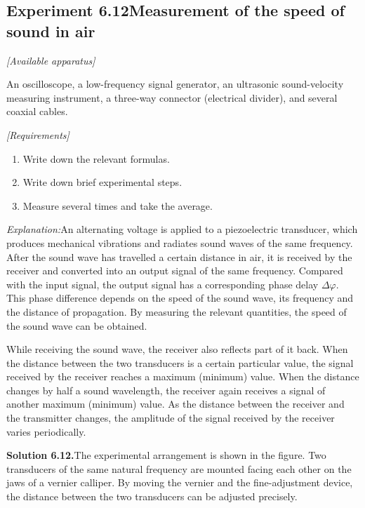 \subsection*{Experiment 6.12\quad Measurement of the speed of sound in air}

\noindent\textit{[Available apparatus]}

An oscilloscope, a low-frequency signal generator, an ultrasonic sound-velocity measuring instrument, a three-way connector (electrical divider), and several coaxial cables.

\noindent\textit{[Requirements]}
\begin{enumerate}[label=(\arabic*),leftmargin=2.2em,itemsep=1pt,topsep=2pt]
\item Write down the relevant formulas.
\item Write down brief experimental steps.
\item Measure several times and take the average.
\end{enumerate}

\noindent\textit{Explanation:}\quad An alternating voltage is applied to a piezoelectric transducer, which produces mechanical vibrations and radiates sound waves of the same frequency. After the sound wave has travelled a certain distance in air, it is received by the receiver and converted into an output signal of the same frequency. Compared with the input signal, the output signal has a corresponding phase delay $\Delta\varphi$. This phase difference depends on the speed of the sound wave, its frequency and the distance of propagation. By measuring the relevant quantities, the speed of the sound wave can be obtained.

While receiving the sound wave, the receiver also reflects part of it back. When the distance between the two transducers is a certain particular value, the signal received by the receiver reaches a maximum (minimum) value. When the distance changes by half a sound wavelength, the receiver again receives a signal of another maximum (minimum) value. As the distance between the receiver and the transmitter changes, the amplitude of the signal received by the receiver varies periodically.

\medskip
\noindent\textbf{Solution 6.12.}\quad The experimental arrangement is shown in the figure. Two transducers of the same natural frequency are mounted facing each other on the jaws of a vernier calliper. By moving the vernier and the fine-adjustment device, the distance between the two transducers can be adjusted precisely.

